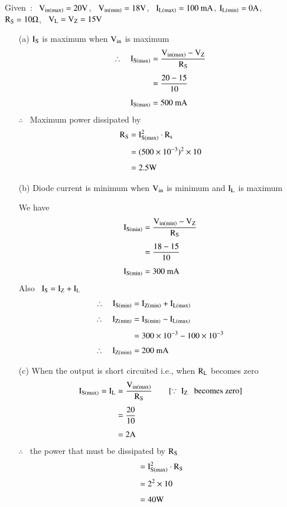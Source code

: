 \begin{solution}
Given~:~ $\textrm{V}_{\text{in}(\max)}=20\textrm{V}$, \ $\textrm{V}_{\text{in}(\min)}=18\textrm{V}$, \ $\textrm{I}_{\textrm{L}(\max)}=100\text{~mA}$, $\textrm{I}_{\textrm{L}(\min)}=0\textrm{A}$, \ $\textrm{R}_{\textrm{S}}=10\Omega$, \ $\textrm{V}_{\textrm{L}}=\textrm{V}_{\textrm{Z}}=15\textrm{V}$
\begin{itemize}
\item[(a)] $\textrm{I}_{\textrm{S}}$ is maximum when $\textrm{V}_{\text{in}}$ is maximum
\begin{align*}
\therefore\quad \textrm{I}_{\textrm{S}(\max)} &= \dfrac{\textrm{V}_{\text{in}(\max)}-\textrm{V}_{\textrm{Z}}}{\textrm{R}_{\textrm{S}}}\\[4pt]
&= \dfrac{20-15}{10}\\[4pt]
\textrm{I}_{\textrm{S}(\max)} &= 500\text{~mA}
\end{align*}
$\therefore$~ Maximum power dissipated by
\begin{align*}
\textrm{R}_{\textrm{S}} &= \textrm{I}^{2}_{\textrm{S}(\max)}\cdot \textrm{R}_{\textrm{s}}\\[4pt]
&= (500\times 10^{-3})^{2}\times 10\\[4pt]
&= 2.5\textrm{W}
\end{align*}

\item[(b)] Diode current is minimum when $\textrm{V}_{\text{in}}$ is minimum and $\textrm{I}_{\textrm{L}}$ is maximum 

We have
\begin{align*}
\textrm{I}_{\textrm{S}(\min)} &= \dfrac{\textrm{V}_{\text{in}(\min)}-\textrm{V}_{\textrm{Z}}}{\textrm{R}_{\textrm{S}}}\\[4pt]
&= \frac{18-15}{10}\\[4pt]
\textrm{I}_{\textrm{S}(\min)} &= 300\text{~mA}
\end{align*}
Also \ $\textrm{I}_{\textrm{S}}=\textrm{I}_{\textrm{Z}}+\textrm{I}_{\textrm{L}}$
\begin{align*}
\therefore\quad \textrm{I}_{\textrm{S}(\min)} &= \textrm{I}_{\textrm{Z}(\min)}+\textrm{I}_{\textrm{L}(\max)}\\[4pt]
\therefore\quad \textrm{I}_{\textrm{Z}(\min)} &= \textrm{I}_{\textrm{S}(\min)}-\textrm{I}_{\textrm{L}(\max)}\\[4pt]
&= 300\times 10^{-3}-100\times 10^{-3}\\[3pt]
\therefore\quad \textrm{I}_{\textrm{Z}(\min)} &= 200\text{~mA}
\end{align*}

\item[(c)] When the output is short circuited i.e., when $\textrm{R}_{\textrm{L}}$ becomes zero
\begin{align*}
\rmI_{\rmS(\max)}=\rmI_{\rmL} &= \frac{\rmV_{\text{in}(\max)}}{\rmR_{\rmS}}\qquad [\because \ \rmI_{\rmZ}\text{~~ becomes zero}]\\[4pt]
&= \dfrac{20}{10}\\[4pt]
&= 2\rmA
\end{align*}
$\therefore$~ the power that must be dissipated by $\textrm{R}_{\textrm{S}}$
\begin{align*}
&= \textrm{I}^{2}_{\textrm{S}(\max)}\cdot \textrm{R}_{\textrm{S}}\\[4pt]
&= 2^{2}\times 10\\[4pt]
&= 40\textrm{W}
\end{align*}
\end{itemize}
\end{solution}

